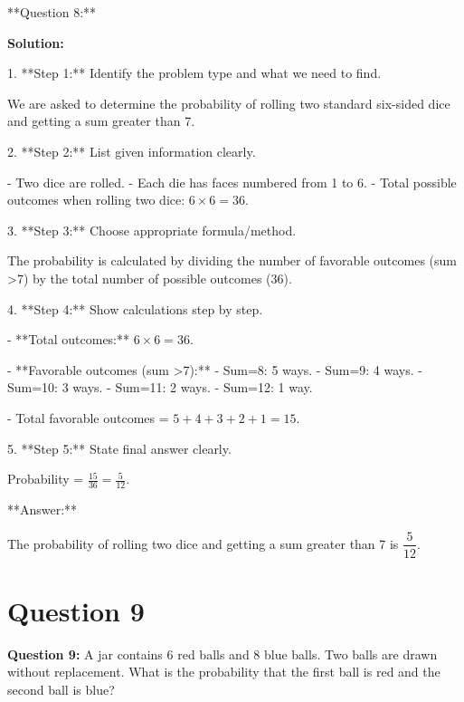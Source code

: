 \documentclass[12pt]{article}
\begin{document}
**Question 8:**

\textbf{Solution:}

1. **Step 1:** Identify the problem type and what we need to find.

   We are asked to determine the probability of rolling two standard six-sided dice and getting a sum greater than 7.

2. **Step 2:** List given information clearly.

   - Two dice are rolled.
   - Each die has faces numbered from 1 to 6.
   - Total possible outcomes when rolling two dice: \(6 \times 6 = 36\).

3. **Step 3:** Choose appropriate formula/method.

   The probability is calculated by dividing the number of favorable outcomes (sum >7) by the total number of possible outcomes (36).

4. **Step 4:** Show calculations step by step.

   - **Total outcomes:** \(6 \times 6 = 36\).
   
   - **Favorable outcomes (sum >7):**
     - Sum=8: 5 ways.
     - Sum=9: 4 ways.
     - Sum=10: 3 ways.
     - Sum=11: 2 ways.
     - Sum=12: 1 way.
   
   - Total favorable outcomes = \(5 + 4 + 3 + 2 + 1 = 15\).

5. **Step 5:** State final answer clearly.

   Probability = \(\frac{15}{36} = \frac{5}{12}\).

**Answer:**

The probability of rolling two dice and getting a sum greater than 7 is \(\boxed{\dfrac{5}{12}}\).
\newpage

\section{Question 9}

\textbf{Question 9:} A jar contains 6 red balls and 8 blue balls. Two balls are drawn without replacement. What is the probability that the first ball is red and the second ball is blue?
\end{document}
